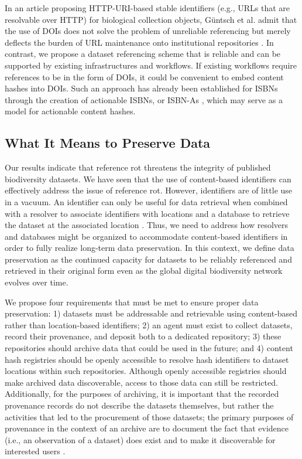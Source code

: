 In an article proposing HTTP-URI-based stable identifiers (e.g., URLs that are resolvable over HTTP) for biological collection objects, Güntsch et al. admit that the use of DOIs does not solve the problem of unreliable referencing but merely deflects the burden of URL maintenance onto institutional repositories \citep{G_ntsch_2017}. In contrast, we propose a dataset referencing scheme that is reliable and can be supported by existing infrastructures and workflows. If existing workflows require references to be in the form of DOIs, it could be convenient to embed content hashes into DOIs. Such an approach has already been established for ISBNs through the creation of actionable ISBNs, or ISBN-As \citep{Weissberg_2008}, which may serve as a model for actionable content hashes.

\subsection*{What It Means to Preserve Data}
Our results indicate that reference rot threatens the integrity of published biodiversity datasets. We have seen that the use of content-based identifiers can effectively address the issue of reference rot. However, identifiers are of little use in a vacuum. An identifier can only be useful for data retrieval when combined with a resolver to associate identifiers with locations and a database to retrieve the dataset at the associated location \citep{Paskin_1999}. Thus, we need to address how resolvers and databases might be organized to accommodate content-based identifiers in order to fully realize long-term data preservation. In this context, we define data preservation as the continued capacity for datasets to be reliably referenced and retrieved in their original form even as the global digital biodiversity network evolves over time.

We propose four requirements that must be met to ensure proper data preservation: 1) datasets must be addressable and retrievable using content-based rather than location-based identifiers; 2) an agent must exist to collect datasets, record their provenance, and deposit both to a dedicated repository; 3) these repositories should archive data that could be used in the future; and 4) content hash registries should be openly accessible to resolve hash identifiers to dataset locations within such repositories. Although openly accessible registries should make archived data discoverable, access to those data can still be restricted. Additionally, for the purposes of archiving, it is important that the recorded provenance records do not describe the datasets themselves, but rather the activities that led to the procurement of those datasets; the primary purposes of provenance in the context of an archive are to document the fact that evidence (i.e., an observation of a dataset) does exist and to make it discoverable for interested users \citep{Bearman_1995}.

